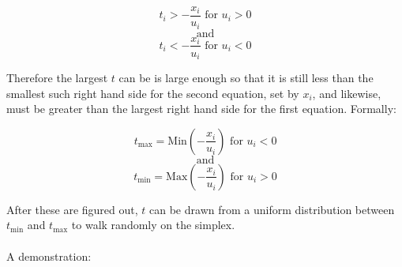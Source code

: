 \documentclass{article}\usepackage{graphicx, color}
\begin{document}
$$ t_i \gt -\frac{x_i}{u_i} \text{ for } u_i > 0 $$
$$ \text{and}$$
$$ t_i \lt -\frac{x_i}{u_i} \text{ for } u_i < 0 $$

Therefore the largest $t$ can be is large enough so that it is still
less than the smallest such right hand side for the second equation,
set by $x_i$, and likewise, must be greater than the largest right
hand side for the first equation. Formally:

$$  t_{\text{max}} = \text{Min}(-\frac{x_i}{u_i}) \text{ for } u_i < 0 $$
$$ \text{and}$$
$$  t_{\text{min}} = \text{Max}(-\frac{x_i}{u_i}) \text{ for } u_i > 0 $$

After these are figured out, $t$ can be drawn from a uniform
distribution between $t_{\text{min}}$ and $t_{\text{max}}$ to walk
randomly on the simplex.
\\ \\

\noindent A demonstration:
\end{document}
